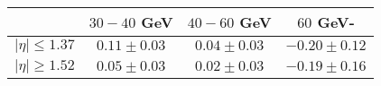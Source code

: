 \centering
\begin{tabular}{cccc} \toprule\toprule
 & $30-40$ GeV & $40-60$ GeV & $60$ GeV-\\\midrule
$\lvert \eta \rvert \leq 1.37$ & $0.11\pm0.03$ & $0.04\pm0.03$ & $-0.20\pm0.12$\\
$\lvert \eta \rvert \geq 1.52$ & $0.05\pm0.03$ & $0.02\pm0.03$ & $-0.19\pm0.16$\\
\bottomrule\bottomrule
\end{tabular}
